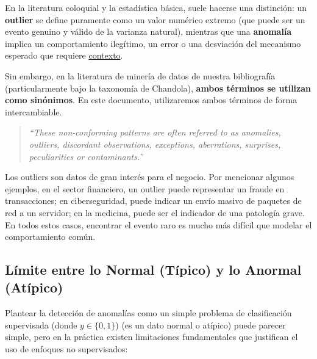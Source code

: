 \begin{tcolorbox}[
	colback=gray!10,
	colframe=gray!50,
	title=Aclaración Semántica: ¿Outlier o Anomalía?
	]
	
	En la literatura coloquial y la estadística básica, suele hacerse una distinción: un \textbf{outlier} se define puramente como un valor numérico extremo (que puede ser un evento genuino y válido de la varianza natural), mientras que una \textbf{anomalía} implica un comportamiento ilegítimo, un error o una desviación del mecanismo esperado que requiere \underline{contexto}.
	
	Sin embargo, en la literatura de minería de datos de nuestra bibliografía (particularmente bajo la taxonomía de Chandola), \textbf{ambos términos se utilizan como sinónimos}. En este documento, utilizaremos ambos términos de forma intercambiable.
	
	\begin{quote}
		\textit{``These non-conforming patterns are often referred to as anomalies, outliers, discordant observations, exceptions, aberrations, surprises, peculiarities or contaminants.''}
	\end{quote}
	
\end{tcolorbox}

Los outliers son datos de gran interés para el negocio. Por mencionar algunos ejemplos, en el sector financiero, un outlier puede representar un fraude en transacciones; en ciberseguridad, puede indicar un envío masivo de paquetes de red a un servidor; en la medicina, puede ser el indicador de una patología grave. En todos estos casos, encontrar el evento raro es mucho más difícil que modelar el comportamiento común.

\subsection{Límite entre lo Normal (Típico) y lo Anormal (Atípico)}

Plantear la detección de anomalías como un simple problema de clasificación supervisada (donde $y \in \{0, 1\}$) (es un dato normal o atípico) puede parecer simple, pero en la práctica existen limitaciones fundamentales que justifican el uso de enfoques no supervisados:

